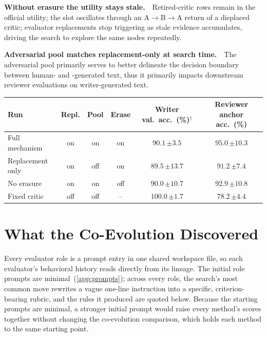 \noindent\textbf{Without erasure the utility stays stale.}~~Retired-critic rows remain in the official utility; the slot oscillates through an A$\to$B$\to$A return of a displaced critic; evaluator replacements stop triggering as stale evidence accumulates, driving the search to explore the same nodes repeatedly.

\noindent\textbf{Adversarial pool matches replacement-only at search time.}~~The adversarial pool primarily serves to better delineate the decision boundary between human- and \AI-generated text, thus it primarily impacts downstream reviewer evaluations on writer-generated text.

\begin{widetable}[H]
\centering
\caption{\textbf{Mechanism ablations on the evaluator-independent anchor.} All runs use a $12{,}288$-evaluation budget. Reviewer anchor accuracy is comparable across runs, while writer acceptance ($\dagger$), scored by each run's own critic, is not. Cells report mean $\pm$ 95\% Jeffreys interval.}
\label{tab:nemotron-runs}
\small
\setlength{\tabcolsep}{4.5pt}
\begin{tabular}{l c c c c c}
\toprule
Run & Repl. & Pool & Erase & Writer val.\ acc.\ (\%)$^{\dagger}$ & Reviewer anchor acc.\ (\%) \\
\midrule
Full mechanism & on & on & on & $90.1$\,{\color{black!55}\scriptsize$\pm 3.5$} & $95.0$\,{\color{black!55}\scriptsize$\pm 10.3$} \\
Replacement only & on & off & on & $89.5$\,{\color{black!55}\scriptsize$\pm 13.7$} & $91.2$\,{\color{black!55}\scriptsize$\pm 7.4$} \\
No erasure & on & on & off & $90.0$\,{\color{black!55}\scriptsize$\pm 10.7$} & $92.9$\,{\color{black!55}\scriptsize$\pm 10.8$} \\
\addlinespace
Fixed critic & off & off & {--} & $100.0$\,{\color{black!55}\scriptsize$\pm 1.7$} & $78.2$\,{\color{black!55}\scriptsize$\pm 4.4$} \\
\bottomrule
\end{tabular}
\end{widetable}




\section{What the Co-Evolution Discovered}
\label{app:evaluator-evolution}

Every evaluator role is a prompt entry in one shared workspace file, so each evaluator's behavioral history reads directly from its lineage. The initial role prompts are minimal~(\cref{app:prompts}); across every role, the search's most common move rewrites a vague one-line instruction into a specific, criterion-bearing rubric, and the rules it produced are quoted below. Because the starting prompts are minimal, a stronger initial prompt would raise every method's scores together without changing the co-evolution comparison, which holds each method to the same starting point.

